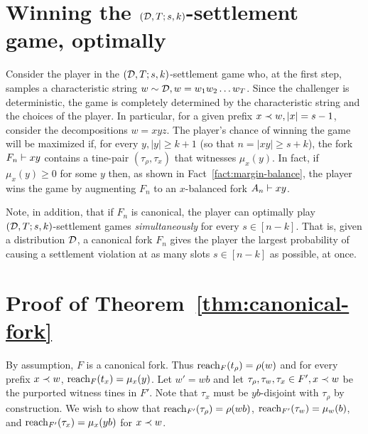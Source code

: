 \section{Winning the \texorpdfstring{$(\mathcal{D},T;s,k)$-}{}settlement game, optimally}\label{sec:adv-winning-settlement-game} 
	Consider the player in the $(\mathcal{D},T;s,k)$-settlement game 
	who, at the first step, samples 
	a characteristic string $w \sim \mathcal{D}, w = w_1 w_2 \ldots w_T$. 
	Since the challenger is deterministic, 
	the game is completely determined by the characteristic string 
	and the choices of the player. 
	In particular, for a given prefix $x \prec w, |x| = s - 1$, 
	consider the decompositions $w = xyz$. 
	The player's chance of winning the game will be maximized if, 
	for every $y, |y| \geq k + 1$ (so that $n = |xy|\geq s + k$),
	the fork $F_n \vdash xy$ 
	contains a tine-pair $(\tau_\rho, \tau_x)$ that witnesses $\mu_x(y)$. 
	In fact, 
	if $\mu_x(y) \geq 0$ for some $y$ then, 
	as shown in Fact~\ref{fact:margin-balance}, 
	the player wins the game by
	augmenting $F_n$ to an $x$-balanced fork $A_n \vdash xy$. 

	Note, in addition, that if $F_n$ is canonical, 
	the player can optimally play $(\mathcal{D}, T; s, k)$-settlement games 
	\emph{simultaneously} for every $s \in [n - k]$. 
	That is, given a distribution $\mathcal{D}$, 
	a canonical fork $F_n$ gives the player 
	the largest probability 
	of causing a settlement violation at as many slots $s \in [n - k]$ as possible, 
	at once.

\section{Proof of Theorem~\ref{thm:canonical-fork}}
	By assumption, $F$ is a canonical fork. 
	Thus $\operatorname{reach}_F(t_\rho) = \rho(w)$ 
	and 
	for every prefix $x \prec w$, 
	$\operatorname{reach}_F(t_x) = \mu_x(y)$. 
	Let $w' = wb$ and let $\tau_\rho, \tau_w, 
	\tau_x \in F^\prime, x \prec w$ 
	be the purported witness tines in $F'$. 
	Note that $\tau_x$ must be 
	$yb$-disjoint with $\tau_\rho$ by construction. 
	We wish to show that 
	$\operatorname{reach}_{F^\prime}(\tau_\rho) = \rho(w b)$, 
	$\operatorname{reach}_{F^\prime}(\tau_w) = \mu_{w}(b)$,  
	and 
	$\operatorname{reach}_{F^\prime}(\tau_x) = \mu_x(y b)$ for $x \prec w$.	

